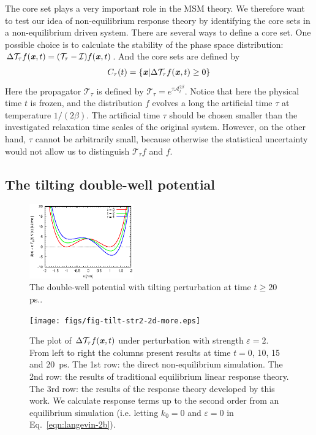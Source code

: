 \documentclass[aip,jcp,a4paper,reprint,onecolumn]{revtex4-1}
\newcommand{\vect}[1]{\textbf{\textit{#1}}}
\newcommand{\eps}{\varepsilon}
\newcommand{\mt}{\mathcal T}
\newcommand{\mi}{\mathcal I}
\newcommand{\fwg}{{\mathcal A}}
\begin{document}
The core set plays a very important role in the MSM theory.  We
therefore want to test our idea of non-equilibrium response theory by
identifying the core sets in a non-equilibrium driven system.
There are several ways to define a core set.
One possible choice  is to calculate the stability of the phase space
distribution: $\Delta \mt_\tau f(\vect x, t) = (\mt_\tau -\mi) f(\vect
x, t)$. And the core sets are defined by
\begin{align}
  C_\tau(t) = \{\vect x\vert \Delta \mt_\tau f(\vect x, t) \geq 0\}
\end{align}
Here the propagator $\mt_\tau$ is defined by $\mt_\tau =
e^{\tau\fwg_t^{2\beta}}$.  Notice that here the physical time $t$ is
frozen, and the distribution $f$ evolves a long the artificial time
$\tau$ at temperature $1/(2\beta)$. The artificial time $\tau$ should
be chosen smaller than the investigated relaxation time scales of the
original system. However, on the other hand, $\tau$ cannot be
arbitrarily small, because otherwise the statistical uncertainty would
not allow us to distinguish $\mt_\tau f$ and $f$.


\subsection{The tilting double-well potential}

\begin{figure}
  \centering
  \includegraphics[width=0.4\textwidth]{figs/fig-tilt-pot.eps}
  \caption{The double-well potential with tilting perturbation at
    time $t\geq 20$ ps..}
  \label{fig:tmp1}
\end{figure}

\begin{figure}
  \centering
  \texttt{[image: figs/fig-tilt-str2-2d-more.eps]}
  \caption{The plot of $\Delta\mt_\tau f(\vect x,t)$ under
    perturbation with strength $\eps = 2$.  From left to right the
    columns present results at time $t = 0$, 10, 15 and
    20~\textsf{ps}.  The 1st row: the direct non-equilibrium
    simulation. The 2nd row: the results of traditional equilibrium
    linear response theory.  The 3rd row: the results of the response
    theory developed by this work.  We calculate response terms up to
    the second order from an equilibrium simulation (i.e. letting $k_0
    = 0$ and $\eps = 0$ in Eq.~\eqref{eqn:langevin-2b}).
  }
  \label{fig:tmp2}
\end{figure}
\end{document}
